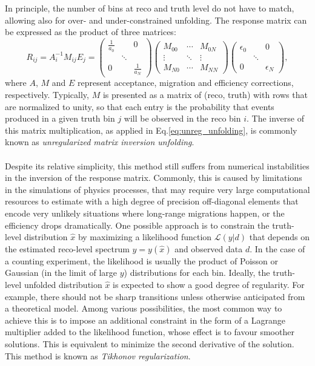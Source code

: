 \documentclass{article}
\begin{document}
In principle, the number of bins at reco and truth level do not have to match, allowing also for over- and under-constrained unfolding. The response matrix can be expressed as the product of three matrices:
%
\begin{equation}
R_{ij} = A_i^{-1}M_{ij}E_j =
\left(\begin{smallmatrix}
\frac{1}{a_0} & & 0 \\ 
 & \ddots & \\ 
0 & & \frac{1}{a_N} 
\end{smallmatrix}\right)
\left(\begin{smallmatrix}
M_{00} & \cdots & M_{0N} \\ 
\vdots & \ddots & \vdots \\ 
M_{N0} & \cdots & M_{NN} 
\end{smallmatrix}\right)
\left(\begin{smallmatrix}
\epsilon_0 & & 0 \\ 
 & \ddots & \\ 
0 & & \epsilon_N 
\end{smallmatrix}\right),
\end{equation}
%
where $A$, $M$ and $E$ represent acceptance, migration and efficiency corrections, respectively. 
Typically, $M$ is presented as a matrix of (reco, truth) with rows that are normalized to unity, so that each entry is the probability that events produced in a given truth bin $j$ will be observed in the reco bin $i$. The inverse of this matrix multiplication, as applied in Eq.\ref{eq:unreg_unfolding}, is commonly known as {\sl unregularized matrix inversion unfolding}. 

\paragraph{}
Despite its relative simplicity, this method still suffers from numerical instabilities in the inversion of the response matrix. Commonly, this is caused by limitations in the simulations of physics processes, that may require very large computational resources to estimate with a high degree of precision off-diagonal elements that encode very unlikely situations where long-range migrations happen, or the efficiency drops dramatically. One possible approach is to constrain the truth-level distribution $\hat{x}$ by maximizing a likelihood function $\mathcal{L}(y|d)$ that depends on the estimated reco-level spectrum $y = y(\hat{x})$ and observed data $d$. In the case of a counting experiment, the likelihood is usually the product of Poisson or Gaussian (in the limit of large $y$) distributions for each bin. 
Ideally, the truth-level unfolded distribution $\hat{x}$ is expected to show a good degree of regularity. For example, there should not be sharp transitions unless otherwise anticipated from a theoretical model. Among various possibilities, the most common way to achieve this is to impose an additional constraint in the form of a Lagrange multiplier added to the likelihood function, whose effect is to favour smoother solutions. This is equivalent to minimize the second derivative of the solution. This method is known as {\sl Tikhonov regularization}. 
\end{document}

